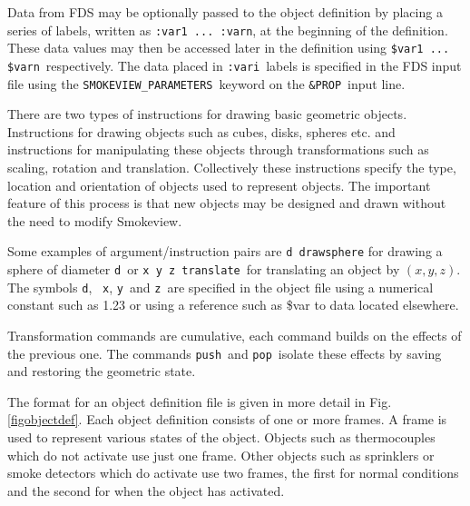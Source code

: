 \documentclass[11pt,twoside]{book}
\begin{document}
Data from FDS may be optionally passed to the object definition by
placing a series of labels, written as {\tt :var1 ... :varn}, at
the beginning of the definition.  These data values may then be
accessed later in the definition using {\tt \$var1 ... \$varn}\
respectively. The data placed in {\tt :vari}\ labels is specified
in the FDS input  file using the {\tt SMOKEVIEW\_PARAMETERS}\
keyword on the {\tt \&PROP}\ input line.

There are two types of instructions for drawing basic geometric
objects.  Instructions for drawing objects such as cubes, disks,
spheres etc.  and instructions for manipulating these objects
through transformations such as scaling, rotation and translation.
Collectively these instructions specify the type, location and
orientation of objects used to represent objects.  The important
feature of this process is that new objects may be designed and
drawn without the need to modify Smokeview.

Some examples of argument/instruction pairs are {\tt d drawsphere}
for drawing a sphere of diameter {\tt d}\ or {\tt x y z translate}\
for translating an object by $(x,y,z)$. The symbols {\tt d}, {\tt
x}, {\tt y}\ and {\tt z}\ are specified in the object file using a
numerical constant such as 1.23 or using a reference such as \$var
to data located elsewhere.

Transformation commands are cumulative, each command builds on the
effects of the previous one.  The commands {\tt push}\ and
{\tt pop}\ isolate these effects by saving and restoring the geometric state.

The format for an object definition file is given in more detail
in Fig. \ref{figobjectdef}.  Each object definition consists of
one or more frames.  A frame is used to represent various states
of the object. Objects such as thermocouples which do not activate
use just one frame. Other objects such as sprinklers or smoke
detectors which do activate use two frames, the first for normal
conditions and the second for when the object has activated.
\end{document}

